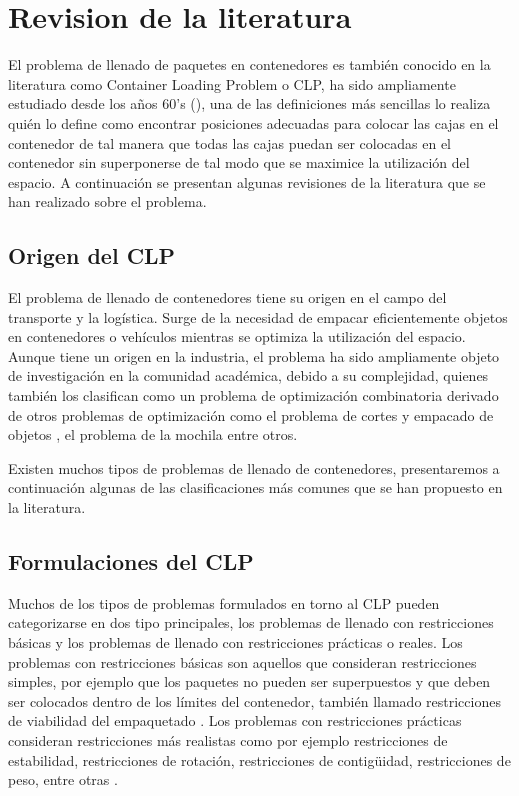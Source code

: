 
\section{Revision de la literatura}

El problema de llenado de paquetes en contenedores es también conocido en la literatura como Container Loading Problem o CLP, ha sido ampliamente estudiado desde los años 60's (\textcite{barnett1967exact}), una de las definiciones más sencillas lo realiza \textcite{GEORGE1980147} quién lo define como encontrar posiciones adecuadas para colocar las cajas en el contenedor de tal manera que todas las cajas puedan ser colocadas en el contenedor sin superponerse de tal modo que se maximice la utilización del espacio. A continuación se presentan algunas revisiones de la literatura que se han realizado sobre el problema.

\subsection{Origen del CLP}

El problema de llenado de contenedores tiene su origen en el campo del transporte y la logística. Surge de la necesidad de empacar eficientemente objetos en contenedores o vehículos mientras se optimiza la utilización del espacio. Aunque tiene un origen en la industria, el problema ha sido ampliamente objeto de investigación en la comunidad académica, debido a su complejidad, quienes también los clasifican como un problema de optimización combinatoria derivado de otros problemas de optimización como el problema de cortes y empacado de objetos \parencite{Alvarez-Valdes2018}, el problema de la mochila \textcite{DEQUEIROZ2012200} entre otros.

Existen muchos tipos de problemas de llenado de contenedores, presentaremos a continuación algunas de las clasificaciones más comunes que se han propuesto en la literatura.

\subsection{Formulaciones del CLP}

Muchos de los tipos de problemas formulados en torno al CLP pueden categorizarse en dos tipo principales, los problemas de llenado con restricciones básicas y los problemas de llenado con restricciones prácticas o reales. Los problemas con restricciones básicas son aquellos que consideran restricciones simples, por ejemplo que los paquetes no pueden ser superpuestos y que deben ser colocados dentro de los límites del contenedor, también llamado restricciones de viabilidad del empaquetado \parencite{scheithauer2017introduction}. Los problemas con restricciones prácticas consideran restricciones más realistas como por ejemplo restricciones de estabilidad, restricciones de rotación, restricciones de contigüidad, restricciones de peso, entre otras \parencite{KURPEL202087}.

